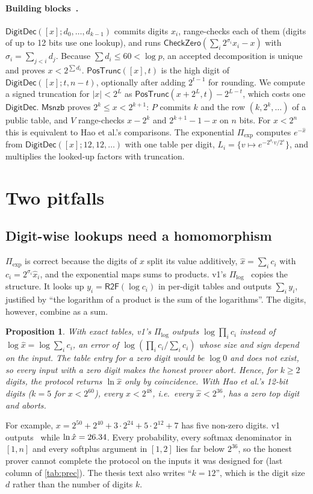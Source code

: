 \documentclass[10pt,twocolumn]{article}
\newtheorem{proposition}{Proposition}
\theoremstyle{remark}
\newcommand{\au}[1]{[#1]}
\newcommand{\RtoF}{\mathsf{R2F}}
\newcommand{\DD}{\mathsf{DigitDec}}
\newcommand{\CZ}{\mathsf{CheckZero}}
\newcommand{\PTrunc}{\mathsf{PosTrunc}}
\newcommand{\Msnzb}{\mathsf{Msnzb}}
\begin{document}
\paragraph{Building blocks~\cite{hao2024scalable}.}
$\DD(\au{x};d_0,\dots,d_{k-1})$ commits digits $x_i$, range-checks each of them (digits of up to
12 bits use one lookup), and runs $\CZ(\sum_i2^{\sigma_i}x_i-x)$ with $\sigma_i=\sum_{j<i}d_j$.
Because $\sum d_i\le60<\log p$, an accepted decomposition is unique and proves $x<2^{\sum d_i}$.
$\PTrunc(\au{x},t)$ is the high digit of $\DD(\au{x};t,n-t)$, optionally after adding $2^{t-1}$
for rounding. We compute a signed truncation for $|x|<2^L$ as $\PTrunc(x+2^L,t)-2^{L-t}$, which
costs one $\DD$. $\Msnzb$ proves $2^k\le x<2^{k+1}$: $P$ commits $k$ and the row $(k,2^k,\dots)$ of
a public table, and $V$ range-checks $x-2^k$ and $2^{k+1}-1-x$ on $n$ bits. For $x<2^n$ this is
equivalent to Hao et al.'s comparisons. The exponential $\Pi_{\exp}$
computes $e^{-\hat x}$ from $\DD(\au{x};12,12,\dots)$ with one table per digit,
$L_i=\{v\mapsto e^{-2^{\sigma_i}v/2^s}\}$, and multiplies the looked-up factors with truncation.

\section{Two pitfalls}\label{sec:pitfalls}

\subsection{Digit-wise lookups need a homomorphism}
$\Pi_{\exp}$ is correct because the digits of $x$ split its value additively,
$\hat x=\sum_i c_i$ with $c_i=2^{\sigma_i}\hat x_i$, and the exponential maps sums to products.
v1's $\Pi_{\log}$~\cite[Fig.~4.1]{chen2025thesis} copies the structure. It looks up
$y_i=\RtoF(\log c_i)$ in per-digit tables and outputs $\sum_i y_i$, justified by
``the logarithm of a product is the sum of the logarithms''. The digits, however, combine as a sum.

\begin{proposition}\label{prop:log}
With exact tables, v1's $\Pi_{\log}$ outputs $\log\prod_ic_i$ instead of $\log\hat x=\log\sum_ic_i$,
an error of $\log(\prod_ic_i/\sum_ic_i)$ whose size and sign depend on the input. The table entry
for a zero digit would be $\log 0$ and does not exist, so every input with a zero digit makes the
honest prover abort. Hence, for $k\ge2$ digits, the protocol returns $\ln\hat x$ only by coincidence.
With Hao et al.'s 12-bit digits ($k=5$ for $x<2^{60}$), every $x<2^{48}$, i.e.\ every
$\hat x<2^{36}$, has a zero top digit and aborts.
\end{proposition}
For example, $x=2^{50}+2^{40}+3\cdot2^{24}+5\cdot2^{12}+7$ has five non-zero digits. v1 outputs
\VOneLogExOut\ while $\ln\hat x=26.34$. Every probability, every softmax denominator
in $[1,n]$ and every softplus argument in $[1,2]$ lies far below $2^{36}$, so the honest prover
cannot complete the protocol on the inputs it was designed for (last column of \cref{tab:prec}).
The thesis text also writes ``$k=12$'', which is the digit size $d$ rather than the number of
digits $k$.
\end{document}
